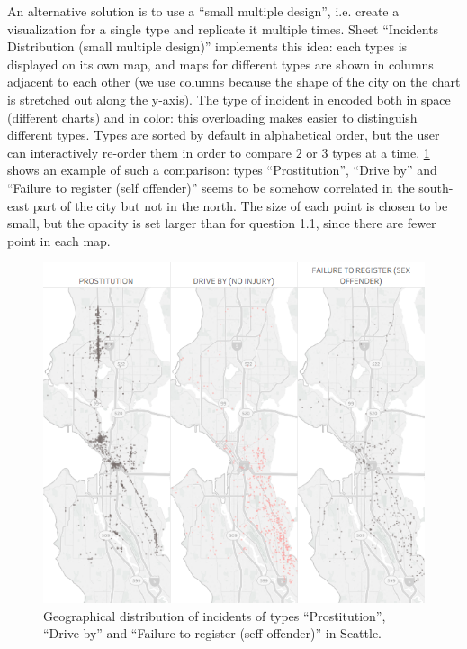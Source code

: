 An alternative solution is to use a ``small multiple design'', i.e. create a visualization for a single type and replicate it multiple times.
Sheet ``Incidents Distribution (small multiple design)'' implements this idea:
each types is displayed on its own map, and maps for different types are shown in columns adjacent to each other (we use columns because the shape of the city on the chart is stretched out along the y-axis).
The type of incident in encoded both in space (different charts) and in color:
this overloading makes easier to distinguish different types.
Types are sorted by default in alphabetical order, but the user can interactively re-order them in order to compare $2$ or $3$ types at a time.
\cref{fig:1_2_geographical_distribution_comparison} shows an example of such a comparison:
types ``Prostitution'', ``Drive by'' and ``Failure to register (self offender)'' seems to be somehow correlated in the south-east part of the city but not in the north.
The size of each point is chosen to be small, but the opacity is set larger than for question 1.1, since there are fewer point in each map.

\begin{figure}[h]
	\centering
	\includegraphics[width=.75\columnwidth]{figures/1_2_geographical_distribution_comparison}
	\caption{Geographical distribution of incidents of types ``Prostitution'', ``Drive by'' and ``Failure to register (seff offender)'' in Seattle.} 
	\label{fig:1_2_geographical_distribution_comparison}
\end{figure}
